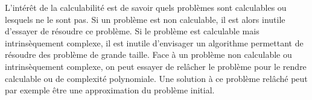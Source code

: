 L'intérêt de la calculabilité est de savoir quels problèmes sont calculables ou lesquels ne le sont pas.  Si un problème est non calculable, il est alors inutile  d'essayer de résoudre ce problème.  Si le problème est calculable mais intrinsèquement complexe, il est inutile d'envisager un algorithme permettant de résoudre des problème de grande taille.  
Face à un problème non calculable ou intrinsèquement complexe,  on peut essayer de relâcher le problème pour le rendre calculable ou de complexité polynomiale.  Une solution à ce problème relâché peut par exemple être une approximation du problème initial.  
